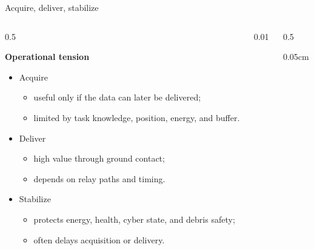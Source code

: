 \documentclass[aspectratio=169]{beamer}
\newcommand{\myCustomSize}[1]{%
  \fontsize{5}{6}\selectfont
  #1
}
\begin{document}
\begin{frame}{Acquire, deliver, stabilize}

  \vspace{0.1cm}
  \begin{columns}[c,totalwidth=\textwidth]

    \begin{column}{0.5\textwidth}

      \scriptsize

      \textbf{Operational tension}

      \begin{itemize}
        \item Acquire
              \begin{itemize}
                \item {\scriptsize useful only if the data can later be delivered;}
                \item {\scriptsize limited by task knowledge, position, energy, and buffer.}
              \end{itemize}

        \item Deliver
              \begin{itemize}
                \item {\scriptsize high value through ground contact;}
                \item {\scriptsize depends on relay paths and timing.}
              \end{itemize}

        \item Stabilize
              \begin{itemize}
                \item {\scriptsize protects energy, health, cyber state, and debris safety;}
                \item {\scriptsize often delays acquisition or delivery.}
              \end{itemize}
      \end{itemize}

    \end{column}

    \begin{column}{0.01\textwidth}
    \end{column}

    \begin{column}{0.5\textwidth}

      \myCustomSize

      \vspace{0.05cm}
      \renewcommand{\arraystretch}{1.5}
      \begin{tabularx}{\linewidth}{p{3cm}p{.8cm} X}
        \toprule


\end{tabularx}
\end{column}
\end{columns}
\end{frame}
\end{document}
